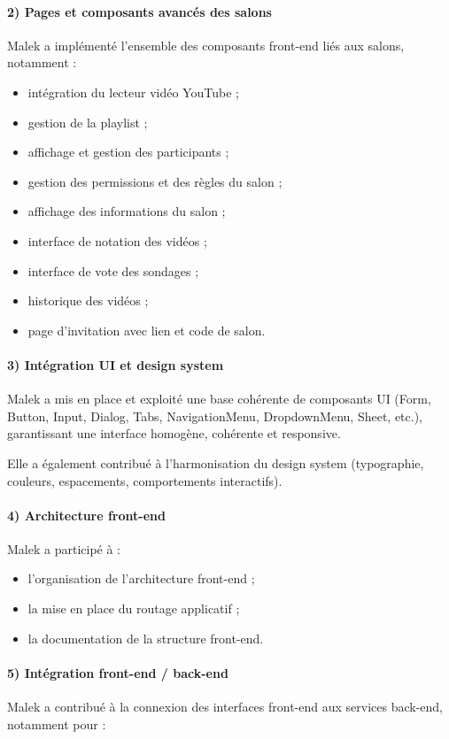 \documentclass[12pt,a4paper]{report}
\begin{document}
\paragraph{2) Pages et composants avancés des salons}
Malek a implémenté l’ensemble des composants front-end liés aux salons, notamment :

\begin{itemize}
  \item intégration du lecteur vidéo YouTube ;
  \item gestion de la playlist ;
  \item affichage et gestion des participants ;
  \item gestion des permissions et des règles du salon ;
  \item affichage des informations du salon ;
  \item interface de notation des vidéos ;
  \item interface de vote des sondages ;
  \item historique des vidéos ;
  \item page d’invitation avec lien et code de salon.
\end{itemize}

\paragraph{3) Intégration UI et design system}
Malek a mis en place et exploité une base cohérente de composants UI (Form, Button, Input, Dialog, Tabs, NavigationMenu, DropdownMenu, Sheet, etc.), garantissant une interface homogène, cohérente et responsive.

Elle a également contribué à l’harmonisation du design system (typographie, couleurs, espacements, comportements interactifs).

\paragraph{4) Architecture front-end}
Malek a participé à :

\begin{itemize}
  \item l’organisation de l’architecture front-end ;
  \item la mise en place du routage applicatif ;
  \item la documentation de la structure front-end.
\end{itemize}

\paragraph{5) Intégration front-end / back-end}
Malek a contribué à la connexion des interfaces front-end aux services back-end, notamment pour :
\end{document}
